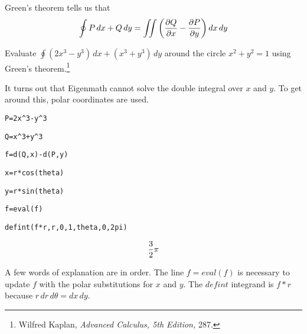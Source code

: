 
\noindent
Green's theorem tells us that
$$\oint P\,dx+Q\,dy=\int\!\!\!\int
\left({\partial Q\over\partial x}-{\partial P\over\partial y}\right)
dx\,dy$$

\noindent
Evaluate $\oint (2x^3-y^3)\,dx+(x^3+y^3)\,dy$ around the circle
$x^2+y^2=1$ using Green's theorem.\footnote{
Wilfred Kaplan, {\it Advanced Calculus, 5th Edition,} 287.}

\medskip
\noindent
It turns out that Eigenmath cannot solve the double integral over
$x$ and $y$.
To get around this, polar coordinates are used.

\medskip
\verb$P=2x^3-y^3$

\verb$Q=x^3+y^3$

\verb$f=d(Q,x)-d(P,y)$

\verb$x=r*cos(theta)$

\verb$y=r*sin(theta)$

\verb$f=eval(f)$

\verb$defint(f*r,r,0,1,theta,0,2pi)$

$${3\over2}\pi$$

\medskip
\noindent
A few words of explanation are in order.
The line $f=eval(f)$ is necessary to update $f$ with the polar
substitutions for
$x$ and $y$.
The $defint$ integrand is $f{*}r$ because $r\,dr\,d\theta=dx\,dy$.

